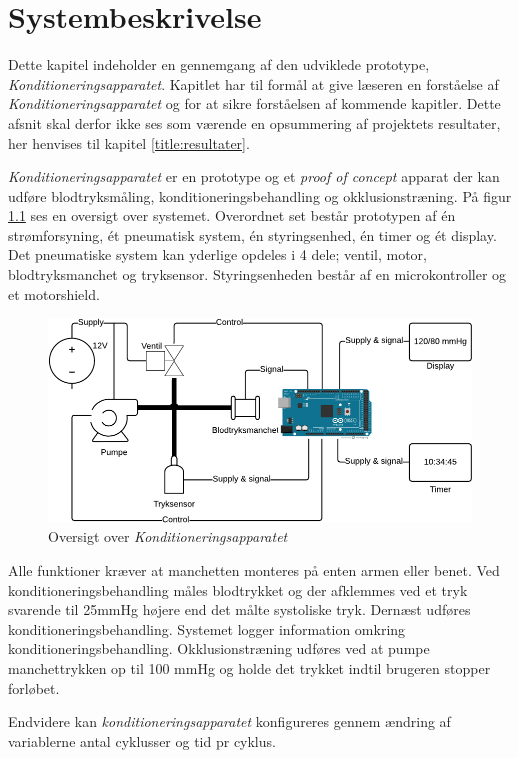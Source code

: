 \chapter{Systembeskrivelse}
Dette kapitel indeholder en gennemgang af den udviklede prototype, \textit{Konditioneringsapparatet}. Kapitlet har til formål at give læseren en forståelse af \textit{Konditioneringsapparatet} og for at sikre forståelsen af kommende kapitler. Dette afsnit skal derfor ikke ses som værende en opsummering af projektets resultater, her henvises til kapitel \ref{title:resultater}.

\textit{Konditioneringsapparatet} er en prototype og et \textit{proof of concept} apparat der kan udføre blodtryksmåling, konditioneringsbehandling og okklusionstræning. På figur \ref{fig:systemTegning} ses en oversigt over systemet. Overordnet set består prototypen af én strømforsyning, ét pneumatisk system, én styringsenhed, én timer og ét display. Det pneumatiske system kan yderlige opdeles i 4 dele; ventil, motor, blodtryksmanchet og tryksensor. Styringsenheden består af en microkontroller og et motorshield. 

\begin{figure}[H]
	\centering
	\includegraphics[width = \textwidth]{billeder/systemDrawing-crop.pdf}
	\caption{Oversigt over \textit{Konditioneringsapparatet}} \label{fig:systemTegning}
\end{figure}

Alle funktioner kræver at manchetten monteres på enten armen eller benet. Ved konditioneringsbehandling måles blodtrykket og der afklemmes ved et tryk svarende til 25mmHg højere end det målte systoliske tryk. Dernæst udføres konditioneringsbehandling. Systemet logger information omkring konditioneringsbehandling. Okklusionstræning udføres ved at pumpe manchettrykken op til 100 mmHg og holde det trykket indtil brugeren stopper forløbet. 

Endvidere kan \textit{konditioneringsapparatet} konfigureres gennem ændring af variablerne antal cyklusser og tid pr cyklus.


